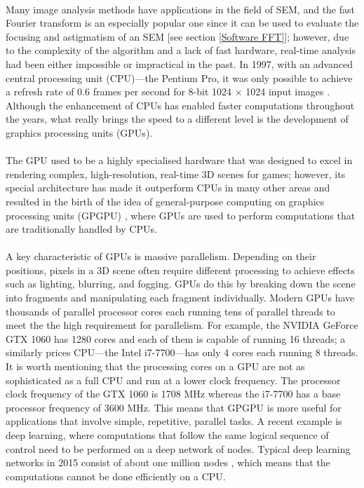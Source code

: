 \documentclass[12pt, twocolumn]{report}
\begin{document}
\paragraph{}
Many image analysis methods have applications in the field of SEM, and the fast Fourier transform is an especially popular one since it can be used to evaluate the focusing and astigmatism of an SEM [see section \ref{Software FFT}]; however, due to the complexity of the algorithm and a lack of fast hardware, real-time analysis had been either impossible or impractical in the past. In 1997, with an advanced central processing unit (CPU)---the Pentium Pro, it was only possible to achieve a refresh rate of 0.6 frames per second for 8-bit 1024 $\times$ 1024 input images \cite{SEM image sharpness measurement}. Although the enhancement of CPUs has enabled faster computations throughout the years, what really brings the speed to a different level is the development of graphics processing units (GPUs).

\paragraph{}
The GPU used to be a highly specialised hardware that was designed to excel in rendering complex, high-resolution, real-time 3D scenes for games; however, its special architecture has made it outperform CPUs in many other areas and resulted in the birth of the idea of general-purpose computing on graphics processing units (GPGPU) \cite{GPU computing}, where GPUs are used to perform computations that are traditionally handled by CPUs.

\paragraph{}
A key characteristic of GPUs is massive parallelism. Depending on their positions, pixels in a 3D scene often require different processing to achieve effects such as lighting, blurring, and fogging. GPUs do this by breaking down the scene into fragments and manipulating each fragment individually. Modern GPUs have thousands of parallel processor cores each running tens of parallel threads to meet the the high requirement for parallelism. For example, the NVIDIA GeForce GTX 1060 has 1280 cores and each of them is capable of running 16 threads; a similarly prices CPU---the Intel i7-7700---has only 4 cores each running 8 threads. It is worth mentioning that the processing cores on a GPU are not as sophisticated as a full CPU and run at a lower clock frequency. The processor clock frequency of the GTX 1060 is 1708 MHz whereas the i7-7700 has a base processor frequency of 3600 MHz. This means that GPGPU is more useful for applications that involve simple, repetitive, parallel tasks. A recent example is deep learning, where computations that follow the same logical sequence of control need to be performed on a deep network of nodes. Typical deep learning networks in 2015 consist of about one million nodes \cite{Deep learning}, which means that the computations cannot be done efficiently on a CPU.
\end{document}
